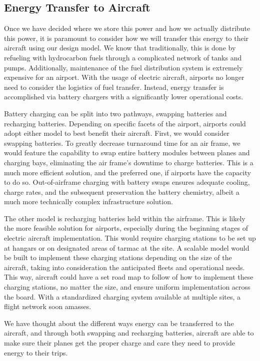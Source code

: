 \documentclass[../main.tex]{subfiles}
\begin{document}
\subsection{Energy Transfer to Aircraft} %
Once we have decided where we store this power and how we actually distribute this power, it is paramount to consider how we will transfer this energy to their aircraft using our design model. We know that traditionally, this is done by refueling with hydrocarbon fuels through a complicated network of tanks and pumps. Additionally, maintenance of the fuel distribution system is extremely expensive for an airport. With the usage of electric aircraft, airports no longer need to consider the logistics of fuel transfer. Instead, energy transfer is accomplished via battery chargers with a significantly lower operational costs.\par
Battery charging can be split into two pathways, swapping batteries and recharging batteries. Depending on specific facets of the airport, airports could adopt either model to best benefit their aircraft. First, we would consider swapping batteries. To greatly decrease turnaround time for an air frame, we would feature the capability to swap entire battery modules between planes and charging bays, eliminating the air frame's downtime to charge batteries. This is a much more efficient solution, and the preferred one, if airports have the capacity to do so. Out-of-airframe charging with battery swaps ensures adequate cooling, charge rates, and the subsequent preservation the battery chemistry, albeit a much more technically complex infrastructure solution.\par
The other model is recharging batteries held within the airframe. This is likely the more feasible solution for airports, especially during the beginning stages of electric aircraft implementation. This would require charging stations to be set up at hangars or on designated areas of tarmac at the site. A scalable model would be built to implement these charging stations depending on the size of the aircraft, taking into consideration the anticipated fleets and operational needs. This way, aircraft could have a set road map to follow of how to implement these charging stations, no matter the size, and ensure uniform implementation across the board. With a standardized charging system available at multiple sites, a flight network soon amasses.\par
We have thought about the different ways energy can be transferred to the aircraft, and through both swapping and recharging batteries, aircraft are able to make sure their planes get the proper charge and care they need to provide energy to their trips.\par
\end{document}
